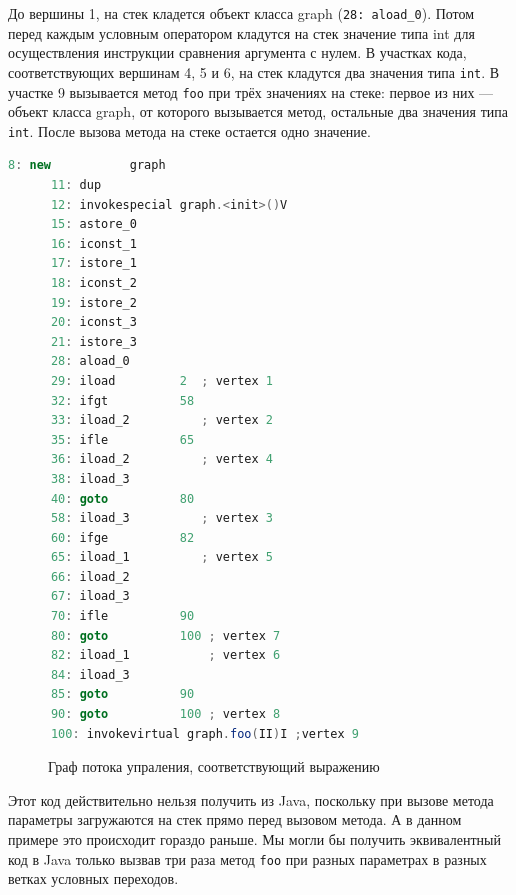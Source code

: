 \documentclass[14pt]{extarticle}
\begin{document}
До вершины 1, на стек кладется объект класса graph (\texttt{28: aload\_0}). Потом перед каждым условным оператором кладутся на стек значение типа int для осуществления инструкции сравнения аргумента с нулем. В участках кода, соответствующих вершинам 4, 5 и 6, на стек кладутся два значения типа \texttt{int}. В участке 9 вызывается метод \texttt{foo} при трёх значениях на стеке: первое из них --- объект класса graph, от которого вызывается метод, остальные два значения типа \texttt{int}. После вызова метода на стеке остается одно значение.

\begin{lstlisting}[label=graph-example,caption = Пример кода выражения в JVM с переходами, frame = single, language = JAVA]
       8: new           graph                  
      11: dup
      12: invokespecial graph.<init>()V                 
      15: astore_0
      16: iconst_1
      17: istore_1
      18: iconst_2
      19: istore_2
      20: iconst_3
      21: istore_3
      28: aload_0  
      29: iload         2  ; vertex 1
      32: ifgt          58 
      33: iload_2          ; vertex 2
      35: ifle          65 
      36: iload_2          ; vertex 4     
      38: iload_3
      40: goto          80 
      58: iload_3          ; vertex 3
      60: ifge          82 
      65: iload_1          ; vertex 5
      66: iload_2
      67: iload_3
      70: ifle          90     
      80: goto          100 ; vertex 7
      82: iload_1           ; vertex 6
      84: iload_3
      85: goto          90
      90: goto          100 ; vertex 8
      100: invokevirtual graph.foo(II)I ;vertex 9
\end{lstlisting}

\begin{figure} [h]
\caption{Граф потока упраления, соответствующий выражению}\label{graph}
\end{figure}

Этот код действительно нельзя получить из Java, поскольку при вызове метода параметры загружаются на стек прямо перед вызовом метода. А в данном примере это происходит гораздо раньше. Мы могли бы получить эквивалентный код в Java только вызвав три раза метод \texttt{foo} при разных параметрах в разных ветках условных переходов. 
\end{document}
